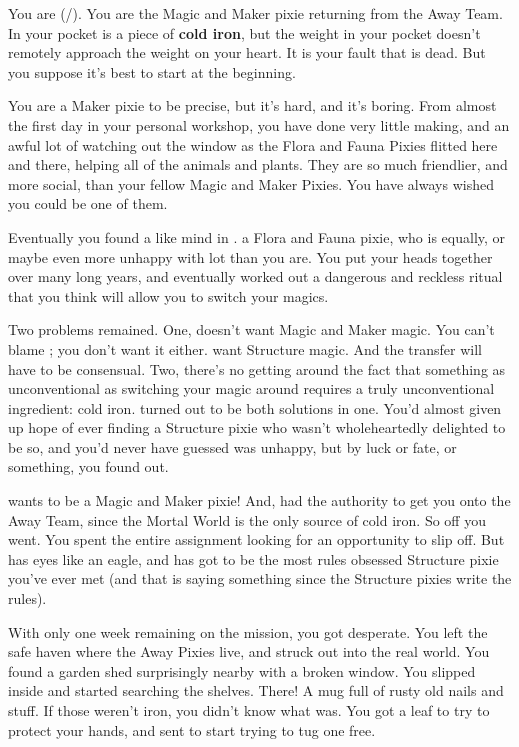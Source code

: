 \documentclass[char]{PP}
\begin{document}
\name{\cMChange{}}

You are \cMChange{} (\cMChange{\They}/\cMChange{\Them}). You are the Magic and Maker pixie returning from the Away Team. In your pocket is a piece of \textbf{cold iron}, but the weight in your pocket doesn’t remotely approach the weight on your heart. It is your fault that \cFLost{} is dead. But you suppose it’s best to start at the beginning.

You are a Maker pixie to be precise, but it’s hard, and it’s boring. From almost the first day in your personal workshop, you have done very little making, and an awful lot of watching out the window as the Flora and Fauna Pixies flitted here and there, helping all of the animals and plants. They are so much friendlier, and more social, than your fellow Magic and Maker Pixies. You have always wished you could be one of them.

Eventually you found a like mind in \cFWanabe{}. \cFWanabe{\Theyare} a Flora and Fauna pixie, who is equally, or maybe even more unhappy with \cFWanabe{\their} lot than you are. You put your heads together over many long years, and eventually worked out a dangerous and reckless ritual that you think will allow you to switch your magics.

Two problems remained. One, \cFWanabe{} doesn’t want Magic and Maker magic. You can’t blame \cFWanabe{\them}; you don’t want it either. \cFWanabe{\They} want Structure magic. And the transfer will have to be consensual. Two, there’s no getting around the fact that something as unconventional as switching your magic around requires a truly unconventional ingredient: cold iron. \cSAdvisor{} turned out to be both solutions in one. You’d almost given up hope of ever finding a Structure pixie who wasn't wholeheartedly delighted to be so, and you’d never have guessed \cSAdvisor{} was unhappy, but by luck or fate, or something, you found out.

\cSAdvisor{} wants to be a Magic and Maker pixie! And, \cSAdvisor{\they} had the authority to get you onto the Away Team, since the Mortal World is the only source of cold iron. So off you went. You spent the entire assignment looking for an opportunity to slip off. But \cSPM{} has eyes like an eagle, and has got to be the most rules obsessed Structure pixie you’ve ever met (and that is saying something since the Structure pixies write the rules).

With only one week remaining on the mission, you got desperate. You left the safe haven where the Away Pixies live, and struck out into the real world. You found a garden shed surprisingly nearby with a broken window. You slipped inside and started searching the shelves. There! A mug full of rusty old nails and stuff. If those weren’t iron, you didn’t know what was. You got a leaf to try to protect your hands, and sent to start trying to tug one free.
\end{document}
